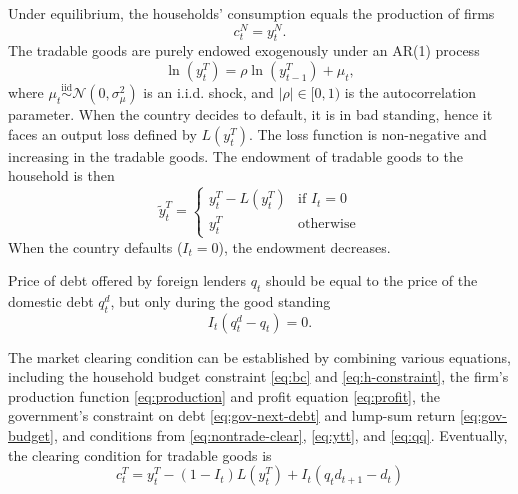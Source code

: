 Under equilibrium, the households' consumption equals the production of firms
\begin{equation}
    \label{eq:nontrade-clear}
    c^N_{t} = y^N_t.
\end{equation}
The tradable goods are purely endowed exogenously under an AR(1) process
\begin{equation}
    \ln(y_t^T) = \rho \ln(y^T_{t-1}) + \mu_t,
\end{equation}
where $\mu_t \overset{\mathrm{iid}}{\sim} \mathcal{N}(0,\sigma_\mu^2)$ is an i.i.d. shock, and $ |\rho| \in [0,1)$ is the autocorrelation parameter.
When the country decides to default, it is in bad standing, hence it faces an output loss defined by $L(y^T_t)$. The loss function is non-negative and increasing in the tradable goods. The endowment of tradable goods to the household is then
\begin{equation}
    \label{eq:ytt}
    \tilde{y}^T_t =
        \begin{cases}
        y^T_t  - L(y^T_t) & \text{if } I_t = 0 \\
        y^T_t & \text{otherwise}
        \end{cases}
\end{equation}
When the country defaults ($I_t = 0$), the endowment decreases.

Price of debt offered by foreign lenders $q_t$ should be equal to the price of the domestic debt $q^d_t$, but only during the good standing
\begin{equation}
    \label{eq:qq}
    I_t(q^d_t - q_t) = 0.
\end{equation}

The market clearing condition can be established by combining various equations, including the household budget constraint \eqref{eq:bc} and \eqref{eq:h-constraint}, the firm's production function \eqref{eq:production} and profit equation \eqref{eq:profit}, the government's constraint on debt \eqref{eq:gov-next-debt} and lump-sum return \eqref{eq:gov-budget}, and conditions from \eqref{eq:nontrade-clear}, \eqref{eq:ytt}, and \eqref{eq:qq}.
Eventually, the clearing condition for tradable goods is
\begin{equation}
    \label{eq:market-clearing}
    c^T_t = y^T_t - (1 - I_t)L(y^T_t) + I_t(q_t d_{t+1} - d_t)
\end{equation}

